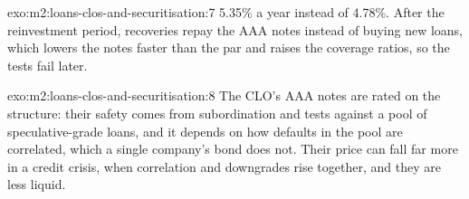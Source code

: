 \begin{solution}{exo:m2:loans-clos-and-securitisation:7}
5.35\% a year instead of 4.78\%. After the reinvestment period, recoveries repay the
AAA notes instead of buying new loans, which lowers the notes faster than the par and
raises the coverage ratios, so the tests fail later.
\end{solution}

\begin{solution}{exo:m2:loans-clos-and-securitisation:8}
The CLO's AAA notes are rated on the structure: their safety comes from subordination
and tests against a pool of speculative-grade loans, and it depends on how defaults in
the pool are correlated, which a single company's bond does not. Their price can fall
far more in a credit crisis, when correlation and downgrades rise together, and they
are less liquid.
\end{solution}

